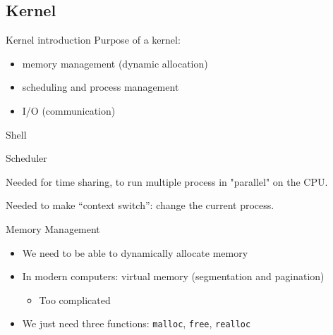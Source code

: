 \documentclass{beamer}
\begin{document}
    \subsection{Kernel}
      \begin{frame}{Kernel introduction}
        Purpose of a kernel:
        \begin{itemize}
          \item memory management (dynamic allocation)
          \item scheduling and process management
          \item I/O (communication)
        \end{itemize}
      \end{frame}

      \begin{frame}{Shell}
      \end{frame}

      \begin{frame}{Scheduler}

        Needed for time sharing, to run multiple process in "parallel" on the CPU.

        \begin{figure}
            \centering
        \end{figure}

        Needed to make ``context switch'': change the current process.
      \end{frame}

      \begin{frame}{Memory Management}
        \begin{itemize}
          \item We need to be able to dynamically allocate memory
          \item In modern computers: virtual memory (segmentation and pagination)
            \begin{itemize}
              \item Too complicated
            \end{itemize}
          \item We just need three functions: \texttt{malloc}, \texttt{free},
            \texttt{realloc}
        \end{itemize}
      \end{frame}
\end{document}

